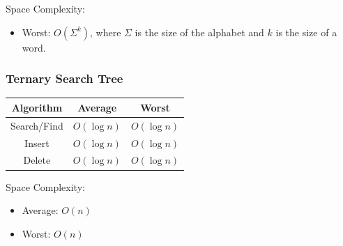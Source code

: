 \documentclass[letterpaper]{article}
\begin{document}
\bigskip 

Space Complexity: 
\begin{itemize}
    \item Worst: $O(\Sigma^k)$, where $\Sigma$ is the size of the alphabet and $k$ is the size of a word. 
\end{itemize}


\subsubsection{Ternary Search Tree}
\begin{center}
    \begin{tabular}{|c|c|c|}
        \hline 
        \textbf{Algorithm} & \textbf{Average} & \textbf{Worst} \\ 
        \hline 
        Search/Find & $O(\log n)$ & $O(\log n)$ \\ 
        Insert & $O(\log n)$ & $O(\log n)$ \\ 
        Delete & $O(\log n)$ & $O(\log n)$ \\ 
        \hline 
    \end{tabular}
\end{center}

Space Complexity: 
\begin{itemize}
    \item Average: $O(n)$ 
    \item Worst: $O(n)$
\end{itemize}
\end{document}
